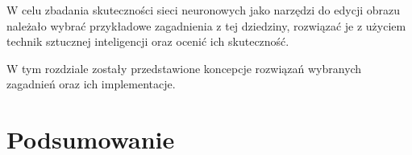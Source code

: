 \documentclass[10pt, a4paper, twoside]{article}
\begin{document}
  W celu zbadania skuteczności sieci neuronowych jako narzędzi do edycji obrazu
  należało wybrać przykładowe zagadnienia z tej dziedziny, rozwiązać je z
  użyciem technik sztucznej inteligencji oraz ocenić ich skuteczność.

  W tym rozdziale zostały przedstawione koncepcje rozwiązań wybranych zagadnień
  oraz ich implementacje.

  

  

  

\section{Podsumowanie}




\end{document}
